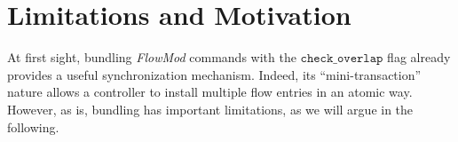 \documentclass[conference]{sigcomm-alternate}
\newcommand{\checko}{\texttt{check\_overlap}\xspace}
\newcommand{\stefan}[1]{\textit{\textcolor{red}{[stefan]: #1}}} %
\newcommand{\petr}[1]{\textit{\textcolor{blue}{[petr]: #1}}} %
\begin{document}
%



\section{Limitations and Motivation}\label{sec:motivation}


At first sight, bundling \emph{FlowMod} commands with  the $\checko$
flag already provides a useful synchronization mechanism.
Indeed, its ``mini-transaction'' nature allows a controller
to install multiple flow entries in an atomic way.
However, as is,
bundling has important limitations, as we will argue in the following.
\end{document}
